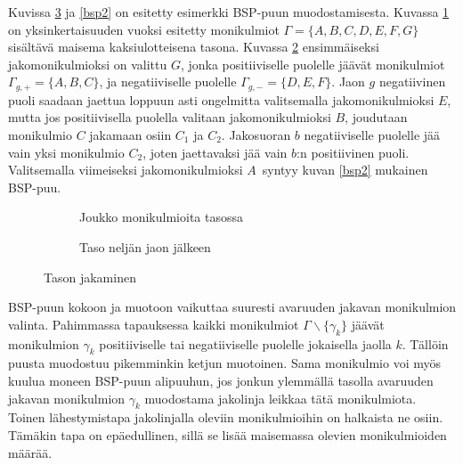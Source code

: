 \documentclass[a4paper, 12pt, titlepage]{article}
\begin{document}
Kuvissa \ref{bsp1} ja \ref{bsp2} on esitetty esimerkki BSP-puun muodostamisesta. Kuvassa \ref{bsp11} on yksinkertaisuuden vuoksi esitetty monikulmiot $\Gamma=\{A,B,C,D,E,F,G\}$ sisältävä maisema kaksiulotteisena tasona. Kuvassa \ref{bsp12} ensimmäiseksi jakomonikulmioksi on valittu $G$, jonka positiiviselle puolelle jäävät monikulmiot $\Gamma_{g,+} = \{A,B,C\}$, ja negatiiviselle puolelle $\Gamma_{g,-} = \{D,E,F\}$. Jaon $g$ negatiivinen puoli saadaan jaettua loppuun asti ongelmitta valitsemalla jakomonikulmioksi $E$, mutta jos positiivisella puolella valitaan jakomonikulmioksi $B$, joudutaan monikulmio $C$ jakamaan osiin $C_1$ ja $C_2$. Jakosuoran $b$ negatiiviselle puolelle jää vain yksi monikulmio $C_2$, joten jaettavaksi jää vain $b$:n positiivinen puoli. Valitsemalla viimeiseksi jakomonikulmioksi $A$ syntyy kuvan \ref{bsp2} mukainen BSP-puu.\\

\begin{figure}[htp]
 \centering
 \begin{subfigure}{0.5\textwidth} 
  \def\svgwidth{0.95\linewidth}
  
  \caption{Joukko monikulmioita tasossa}
  \label{bsp11}
 \end{subfigure}%
 \begin{subfigure}{0.5\textwidth} 
  \def\svgwidth{0.95\linewidth}
  
  \caption{Taso neljän jaon jälkeen}
  \label{bsp12}
 \end{subfigure}
 \caption{Tason jakaminen}
 \label{bsp1}
\end{figure}


BSP-puun kokoon ja muotoon vaikuttaa suuresti avaruuden jakavan monikulmion valinta. Pahimmassa tapauksessa kaikki monikulmiot $\Gamma\backslash\{\gamma_k\}$ jäävät monikulmion $\gamma_k$ positiiviselle tai negatiiviselle puolelle jokaisella jaolla $k$. Tällöin puusta muodostuu pikemminkin ketjun muotoinen. Sama monikulmio voi myös kuulua moneen BSP-puun alipuuhun, jos jonkun ylemmällä tasolla avaruuden jakavan monikulmion $\gamma_k$ muodostama jakolinja leikkaa tätä monikulmiota. \citep[.]{samet} Toinen lähestymistapa jakolinjalla oleviin monikulmioihin on halkaista ne osiin. Tämäkin tapa on epäedullinen, sillä se lisää maisemassa olevien monikulmioiden määrää. \citep[.]{ranta}\\ %
\end{document}
